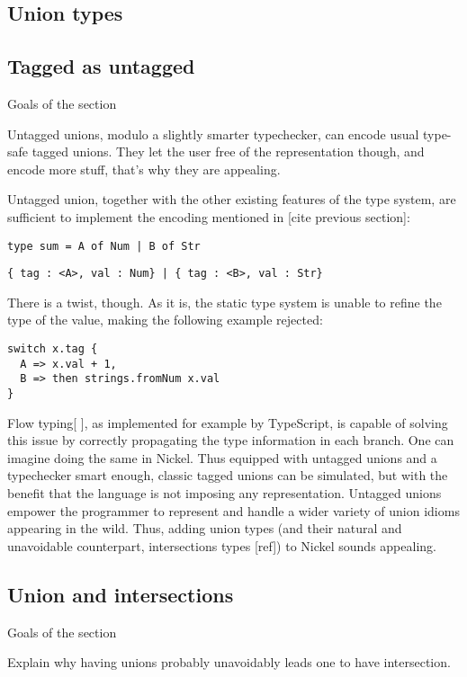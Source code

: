 \documentclass{article}
\begin{document}
\subsection{Union types}

\subsection{Tagged as untagged}
\color{red}Goals of the section

Untagged unions, modulo a slightly smarter typechecker, can encode usual type-safe
tagged unions. They let the user free of the representation though, and encode
more stuff, that's why they are appealing.\vspace{0.5cm}\color{black}

Untagged union, together with the other existing features of the type system,
are sufficient to implement the encoding mentioned in [cite previous section]:

\begin{lstlisting}
type sum = A of Num | B of Str
\end{lstlisting}

\begin{lstlisting}
{ tag : <A>, val : Num} | { tag : <B>, val : Str}
\end{lstlisting}

There is a twist, though. As it is, the static type system is unable to refine
the type of the value, making the following example rejected:

\begin{lstlisting}
switch x.tag {
  A => x.val + 1,
  B => then strings.fromNum x.val
}
\end{lstlisting}

Flow typing[ ], as implemented for example by TypeScript, is capable of solving
this issue by correctly propagating the type information in each branch. One can
imagine doing the same in Nickel. Thus equipped with untagged unions and a
typechecker smart enough, classic tagged unions can be simulated, but with the
benefit that the language is not imposing any representation. Untagged unions
empower the programmer to represent and handle a wider variety of union idioms
appearing in the wild. Thus, adding union types (and their natural and
unavoidable counterpart, intersections types [ref]) to Nickel sounds appealing.

\subsection{Union and intersections}
\color{red}Goals of the section

Explain why having unions probably unavoidably leads one to have intersection.\vspace{0.5cm}\color{black}


\printbibliography
\end{document}
